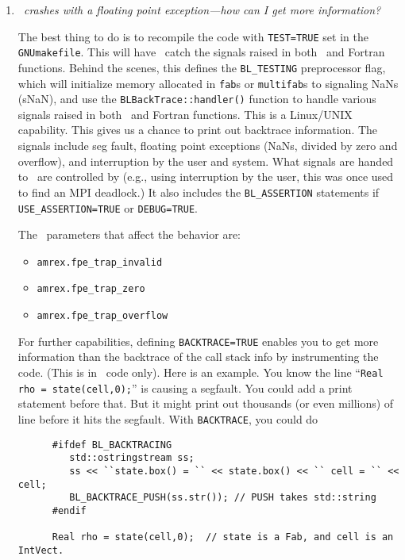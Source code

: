 \begin{enumerate}

\item {\em \castro\ crashes with a floating point exception---how can
  I get more information?}

  The best thing to do is to recompile the code with {\tt TEST=TRUE}
  set in the {\tt GNUmakefile}.  This will have \amrex\ catch the
  signals raised in both \cpp\ and Fortran functions.  Behind the
  scenes, this defines the {\tt BL\_TESTING} preprocessor flag, which
  will initialize memory allocated in {\tt fab}s or {\tt multifab}s to
  signaling NaNs (sNaN), and use the {\tt BLBackTrace::handler()}
  function to handle various signals raised in both \cpp\ and Fortran
  functions.  This is a Linux/UNIX capability.  This gives us a chance
  to print out backtrace information.  The signals include seg fault,
  floating point exceptions (NaNs, divided by zero and overflow), and
  interruption by the user and system.  What signals are handed to
  \amrex\ are controlled by \amrex (e.g., using interruption by the
  user, this was once used to find an MPI deadlock.)  It also includes
  the {\tt BL\_ASSERTION} statements if {\tt USE\_ASSERTION=TRUE} or
  {\tt DEBUG=TRUE}. 

  The \amrex\ parameters that affect the behavior are:
  \begin{itemize}
    \item {\tt amrex.fpe\_trap\_invalid}
    \item {\tt amrex.fpe\_trap\_zero}
    \item {\tt amrex.fpe\_trap\_overflow}
  \end{itemize}

  For further capabilities, defining {\tt BACKTRACE=TRUE} enables you
  to get more information than the backtrace of the call stack info by
  instrumenting the code.  (This is in \cpp\ code only). Here is an
  example.  You know the line ``{\tt Real rho = state(cell,0);}'' is
  causing a segfault.  You could add a print statement before that.
  But it might print out thousands (or even millions) of line before
  it hits the segfault.  With {\tt BACKTRACE}, you could do


\begin{verbatim}
      #ifdef BL_BACKTRACING
         std::ostringstream ss;
         ss << ``state.box() = `` << state.box() << `` cell = `` << cell;
         BL_BACKTRACE_PUSH(ss.str()); // PUSH takes std::string
      #endif

      Real rho = state(cell,0);  // state is a Fab, and cell is an IntVect.
\end{verbatim}          


\end{enumerate}
